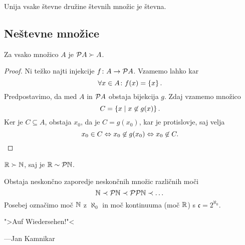 \documentclass[12pt, a4paper]{article}
\renewcommand{\iff}{\Leftrightarrow}
\begin{document}
\begin{posledica}
Unija vsake števne družine števnih množic je števna.
\end{posledica}

\newpage

\subsection{Neštevne množice}

\begin{izrek}[Cantor]
Za vsako množico $A$ je $\mathcal{P} A\succ A$.
\end{izrek}

\begin{proof}
Ni težko najti injekcije $f\colon A\to\mathcal{P} A$. Vzamemo lahko kar
\[
\forall x\in A\colon f(x)=\left\{x\right\}.
\]
Predpostavimo, da med $A$ in $\mathcal{P} A$ obstaja bijekcija $g$. Zdaj vzamemo množico
\[
C=\left\{x\mid x\not\in g(x)\right\}.
\]
Ker je $C\subseteq A$, obstaja $x_0$, da je $C=g(x_0)$, kar je protislovje, saj velja
\[
x_0\in C\iff x_0\not\in g(x_0)\iff x_0\not\in C.\qedhere
\]
\end{proof}

\begin{posledica}
$\mathbb{R}\succ\mathbb{N}$, saj je $\mathbb{R}\sim\mathcal{P}\mathbb{N}$.
\end{posledica}

\begin{posledica}
Obstaja neskončno zaporedje neskončnih množic različnih moči
\[
\mathbb{N}\prec\mathcal{P}\mathbb{N}\prec\mathcal{P}\mathcal{P}\mathbb{N}\prec\dots
\]
Posebej označimo moč $\mathbb{N}$ z $\aleph_0$ in moč kontinuuma (moč $\mathbb{R}$) s $\mathfrak{c}=2^{\aleph_0}$.
\end{posledica}

\vspace{\fill}

\epigraph{">Auf Wiedersehen!"<}{---Jan Kamnikar}

\newpage
\printindex
\end{document}

